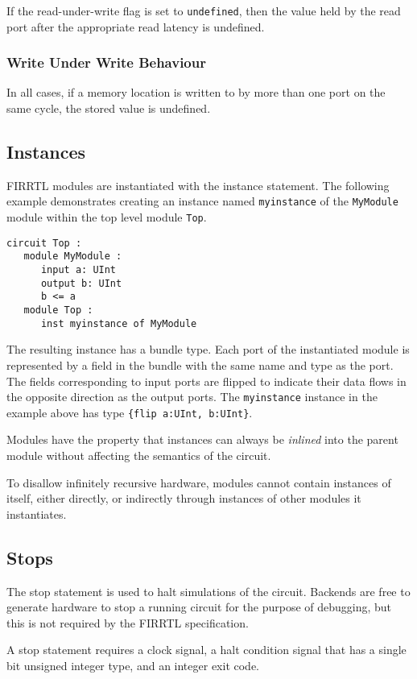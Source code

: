\documentclass[12pt]{article}
\begin{document}
If the read-under-write flag is set to \verb|undefined|, then the value held by the read port after the appropriate read latency is undefined.

\subsubsection{Write Under Write Behaviour}

In all cases, if a memory location is written to by more than one port on the same cycle, the stored value is undefined.

\subsection{Instances}\label{instances}
FIRRTL modules are instantiated with the instance statement. The following example demonstrates creating an instance named \verb|myinstance| of the \verb|MyModule| module within the top level module \verb|Top|. 

\begin{lstlisting}
circuit Top :
   module MyModule :
      input a: UInt
      output b: UInt
      b <= a
   module Top :
      inst myinstance of MyModule   
\end{lstlisting}

The resulting instance has a bundle type. Each port of the instantiated module is represented by a field in the bundle with the same name and type as the port. The fields corresponding to input ports are flipped to indicate their data flows in the opposite direction as the output ports. The \verb|myinstance| instance in the example above has type \verb|{flip a:UInt, b:UInt}|.

Modules have the property that instances can always be {\em inlined} into the parent module without affecting the semantics of the circuit.

To disallow infinitely recursive hardware, modules cannot contain instances of itself, either directly, or indirectly through instances of other modules it instantiates. 

\subsection{Stops}
The stop statement is used to halt simulations of the circuit. Backends are free to generate hardware to stop a running circuit for the purpose of debugging, but this is not required by the FIRRTL specification.

A stop statement requires a clock signal, a halt condition signal that has a single bit unsigned integer type, and an integer exit code.
\end{document}
